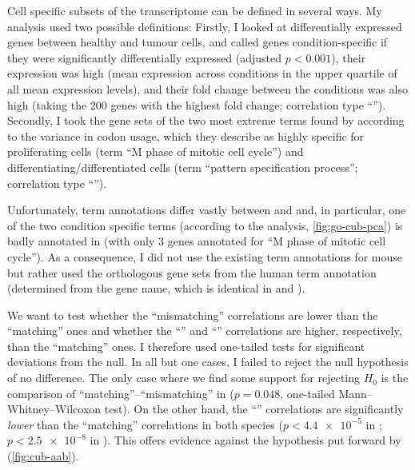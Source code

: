 Cell specific subsets of the transcriptome can be defined in several ways. My
analysis used two possible definitions: Firstly, I looked at differentially
expressed genes between healthy and tumour cells, and called genes
condition-specific if they were significantly differentially expressed (adjusted
\(p < 0.001\)), their expression was high (mean expression across conditions in
the upper quartile of all mean expression levels), and their fold change between
the conditions was also high (taking the \num{200} genes with the highest fold
change; correlation type “”). Secondly, I took the gene sets of the two
most extreme \go terms found by \citet{Gingold:2014} according to the variance
in codon usage, which they describe as highly specific for proliferating cells
(\go term “M phase of mitotic cell cycle”) and differentiating/differentiated
cells (\go term “pattern specification process”; correlation type “”).

Unfortunately, \go term annotations differ vastly between \hsa and \mmu and, in
particular, one of the two condition specific \go terms (according to the \pca
analysis, \cref{fig:go-cub-pca}) is badly annotated in \mmu (with only \num{3}
genes annotated for “M phase of mitotic cell cycle”). As a consequence, I did
not use the existing \go term annotations for mouse but rather used the
orthologous gene sets from the human \go term annotation (determined from the
gene name, which is identical in \mmu and \hsa \citep{Wain:2002}).

We want to test whether the “mismatching” correlations are lower than the
“matching” ones and whether the “” and “” correlations are
higher, respectively, than the “matching” ones. I therefore used one-tailed
tests for significant deviations from the null. In all but one cases, I failed
to reject the null hypothesis of no difference. The only case where we find some
support for rejecting \(H_0\) is the comparison of “matching”--“mismatching” in
\hsa (\(p = 0.048\), one-tailed Mann–Whitney–Wilcoxon test). On the other hand,
the “” correlations are significantly \emph{lower} than the “matching”
correlations in both species (\(p < \num{4.4e-5}\) in \mmu; \(p < \num{2.5e-8}\)
in \hsa). This offers evidence against the hypothesis put forward by
\citet{Gingold:2014} (\cref{fig:cub-aab}).

